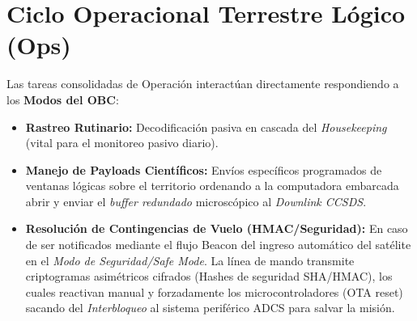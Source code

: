 \section{Ciclo Operacional Terrestre Lógico (Ops)}
Las tareas consolidadas de Operación interactúan directamente respondiendo a los \textbf{Modos del OBC}:
\begin{itemize}
    \item \textbf{Rastreo Rutinario:} Decodificación pasiva en cascada del \textit{Housekeeping} (vital para el monitoreo pasivo diario).
    \item \textbf{Manejo de Payloads Científicos:} Envíos específicos programados de ventanas lógicas sobre el territorio ordenando a la computadora embarcada abrir y enviar el \textit{buffer redundado} microscópico al \textit{Downlink CCSDS}.
    \item \textbf{Resolución de Contingencias de Vuelo (HMAC/Seguridad):} En caso de ser notificados mediante el flujo Beacon del ingreso automático del satélite en el \textit{Modo de Seguridad/Safe Mode}. La línea de mando transmite criptogramas asimétricos cifrados (Hashes de seguridad SHA/HMAC), los cuales reactivan manual y forzadamente los microcontroladores (OTA reset) sacando del \textit{Interbloqueo} al sistema periférico ADCS para salvar la misión.
\end{itemize}
